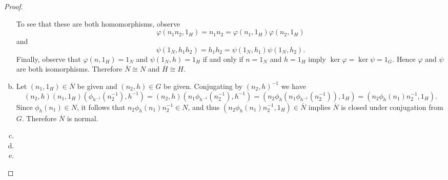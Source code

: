 \documentclass[10pt]{amsart}
\begin{document}
\begin{thm}
\begin{proof}
\begin{enumerate}[(a)]
      To see that these are both homomorphisms, observe
      $$\varphi(n_1n_2, 1_H) = n_1n_2 = \varphi(n_1, 1_H)\varphi(n_2, 1_H)$$
      and
      $$\psi(1_N, h_1h_2) = h_1h_2 = \psi(1_N, h_1)\psi(1_N, h_2).$$
      Finally, observe that $\varphi(n,1_H) = 1_N$ and $\psi(1_N, h) = 1_H$ if and only if $n = 1_N$ and $h = 1_H$ imply $\ker\varphi = \ker\psi = 1_G$.
      Hence $\varphi$ and $\psi$ are both isomorphisms.
      Therefore $\overline{N} \cong N$ and $\overline{H} \cong H$.
    \item
      Let $(n_1, 1_H) \in \overline{N}$ be given and $(n_2, h) \in G$ be given.
      Conjugating by $(n_2, h)^{-1}$ we have
      $$(n_2, h)(n_1, 1_H)(\phi_{h^{-1}}(n_2^{-1}), h^{-1}) = (n_2, h)(n_1\phi_{h^{-1}}(n_2^{-1}), h^{-1}) = (n_2\phi_h(n_1\phi_{h^{-1}}(n_2^{-1})), 1_H) = (n_2\phi_h(n_1)n_2^{-1}, 1_H).$$
      Since $\phi_h(n_1) \in N$, it follows that $n_2\phi_h(n_1)n_2^{-1} \in N$, and thus $(n_2\phi_h(n_1)n_2^{-1}, 1_H) \in \overline{N}$ implies $\overline{N}$ is closed under conjugation from $G$.
      Therefore $\overline{N}$ is normal.
      
    \item
    \item
    \item
    \end{enumerate}
  \end{proof}
\end{thm}
\end{document}
